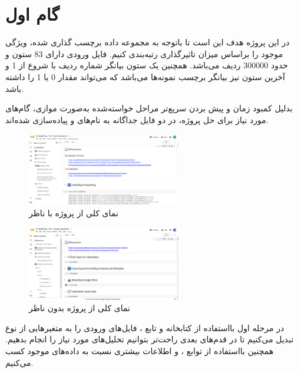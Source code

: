 \documentclass{article}
\begin{document}


\tableofcontents
\newpage

\section{گام اول} 
در این پروژه هدف این است تا باتوجه به مجموعه داده برچسب‌ گذاری شده، ویژگی موجود را براساس میزان تاثیرگذاری رتبه‌بندی کنیم. فایل ورودی دارای 83 ستون و حدود 300000 ردیف می‌باشد. همچنین یک ستون بیانگر شماره ردیف با شروع از 1 و آخرین ستون نیز بیانگر برچسب نمونه‌ها می‌باشد که می‌تواند مقدار 0 یا 1 را داشته باشد.

بدلیل کمبود زمان و پیش بردن سریع‌تر مراحل خواسته‌شده به‌صورت موازی، گام‌های مورد نیاز برای حل پروژه، در دو فایل جداگانه به نام‌های  و  پیاده‌سازی شده‌اند.

\begin{figure}[ht]
        \centering
        \includegraphics[width=0.6\textwidth]{im1-1-su.png}
        \caption{نمای کلی از پروژه با ناظر}
        \label{fig:fig1}
    \end{figure}
    
\begin{figure}[ht]
        \centering
        \includegraphics[width=0.6\textwidth]{img-1-un.png}
        \caption{نمای کلی از پروژه بدون ناظر}
        \label{fig:fig2}
    \end{figure}
    
در مرحله اول بااستفاده از کتابخانه  و تابع ، فایل‌های ورودی را به متغیرهایی از نوع  تبدیل می‌کنیم تا در قدم‌های بعدی راحت‌تر بتوانیم تحلیل‌های مورد نیاز را انجام بدهیم.
همچنین بااستفاده از توابع ،  و  اطلاعات بیشتری نسبت به داده‌های موجود کسب می‌کنیم.
\end{document}
